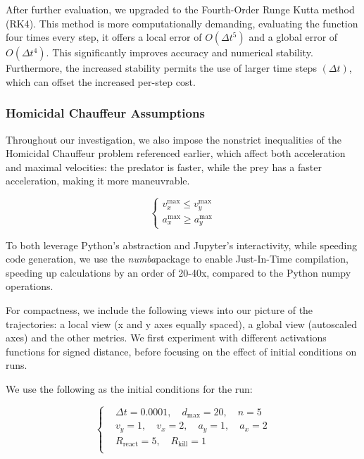 \documentclass[11pt, twocolumn]{article}
\begin{document}
    After further evaluation, we upgraded to the Fourth-Order Runge Kutta method (RK4). This method is more computationally demanding, evaluating the function four times every step, it offers a local error of $O(\Delta t^5)$ and a global error of $O(\Delta t^4)$. This significantly improves accuracy and numerical stability. Furthermore, the increased stability permits the use of larger time steps $(\Delta t)$, which can offset the increased per-step cost.

    \subsubsection{Homicidal Chauffeur Assumptions}
    Throughout our investigation, we also impose the nonstrict inequalities of the Homicidal Chauffeur problem referenced earlier, which affect both acceleration and maximal velocities: the predator is faster, while the prey has a faster acceleration, making it more maneuvrable.

    \[
      \left\{
        \begin{aligned}
          v^{\text{max}}_x \leq v^{\text{max}}_y \\
          a^{\text{max}}_x \geq a^{\text{max}}_y
        \end{aligned}
        \right.
      \]

      To both leverage Python's abstraction and Jupyter's interactivity, while speeding code generation, we use the \textit{numba}package to enable Just-In-Time compilation, speeding up calculations by an order of 20-40x, compared to the Python numpy operations.

      For compactness, we include the following views into our picture of the trajectories: a local view (x and y axes equally spaced), a global view (autoscaled axes) and the other metrics. We first experiment with different activations functions for signed distance, before focusing on the effect of initial conditions on runs.

      We use the following as the initial conditions for the run:

      \[
        \left\{
          \begin{aligned}
            &\Delta t = 0.0001,\quad d_{\text{max}} = 20,\quad n = 5 \\
            &v_y = 1, \quad v_x = 2, \quad a_y = 1, \quad a_x = 2 \\
            &R_{\text{react}} = 5,\quad R_{\text{kill}} = 1 \\
          \end{aligned}
          \right.
        \]
\end{document}
